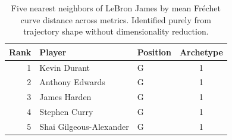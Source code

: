 \begin{table}[htbp]
  \centering\small
  \begin{tabular}{rllc}
    \toprule
    Rank & Player & Position & Archetype \\
    \midrule
    1 & Kevin Durant & G & 1 \\
    2 & Anthony Edwards & G & 1 \\
    3 & James Harden & G & 1 \\
    4 & Stephen Curry & G & 1 \\
    5 & Shai Gilgeous-Alexander & G & 1 \\
    \bottomrule
  \end{tabular}
  \caption{Five nearest neighbors of LeBron James by mean Fr\'{e}chet curve distance across metrics. Identified purely from trajectory shape without dimensionality reduction.}
  \label{tab:LeBron_James_frechet_curve_neighbors}
\end{table}

